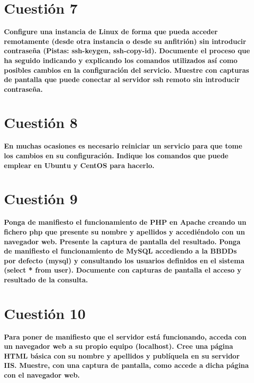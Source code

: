 \documentclass[a4paper,11pt]{article}
\newenvironment{answer}{%
\begin{list}{}{%
}%
\item[]}{\end{list}}
\begin{document}
\section{Cuestión 7}
\textbf{Configure una instancia de Linux de forma que pueda acceder remotamente (desde otra instancia o desde su anfitrión) 
sin introducir contraseña (Pistas: ssh-keygen, ssh-copy-id). Documente el proceso que ha seguido indicando y explicando los
comandos utilizados así como posibles cambios en la configuración del servicio. Muestre con capturas de pantalla que puede 
conectar al servidor ssh remoto sin introducir contraseña.}
\begin{answer}
  
\end{answer}

\section{Cuestión 8}
\textbf{En muchas ocasiones es necesario reiniciar un servicio para que tome los cambios en su configuración. Indique los 
comandos que puede emplear en Ubuntu y CentOS para hacerlo.}
\begin{answer}
  
\end{answer}

\section{Cuestión 9}
\textbf{Ponga de manifiesto el funcionamiento de PHP en Apache creando un fichero php que presente su nombre y apellidos 
y accediéndolo con un navegador web. Presente la captura de pantalla del resultado. Ponga de manifiesto el funcionamiento
de MySQL accediendo a la BBDDs por defecto (mysql) y consultando los usuarios definidos en el sistema (select * from user). 
Documente con capturas de pantalla el acceso y resultado de la consulta.}
\begin{answer}
  
\end{answer}

\section{Cuestión 10}
\textbf{Para poner de manifiesto que el servidor está funcionando, acceda con un navegador web a su propio equipo 
(localhost). Cree una página HTML básica con su nombre y apellidos y publíquela en su servidor IIS. Muestre, con una 
captura de pantalla, como accede a dicha página con el navegador web.}
\begin{answer}
  
\end{answer}
\end{document}
